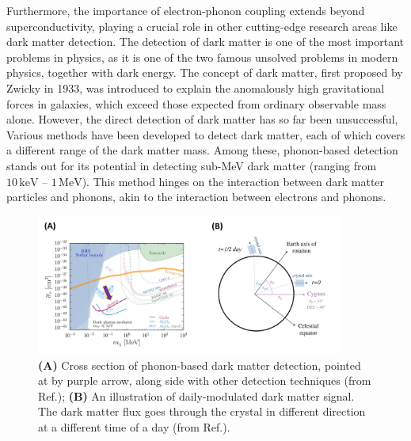 \documentclass[11pt]{article}
\begin{document}
Furthermore, the importance of electron-phonon coupling extends beyond superconductivity, playing a crucial role in other cutting-edge research areas like dark matter detection. The detection of dark matter is one of the most important problems in physics, as it is one of the two famous unsolved problems in modern physics, together with dark energy.
The concept of dark matter, first proposed by Zwicky in 1933\cite{andernach_english_2017}, was introduced to explain the anomalously high gravitational forces in galaxies, which exceed those expected from ordinary observable mass alone. However, the direct detection of dark matter has so far been unsuccessful,
Various methods have been developed to detect dark matter\cite{bergstrom_non-baryonic_2000}, each of which covers a different range of the dark matter mass\cite{vogel_dark_2014,essig_first_2012,davidson_updated_2000}. Among these, phonon-based detection stands out for its potential in detecting sub-MeV dark matter (ranging from $ 10\,\mathrm{keV}$ -- $1\,\mathrm{MeV}$). This method hinges on the interaction between dark matter particles and phonons, akin to the interaction between electrons and phonons\cite{griffin_directional_2018}. 

\begin{figure}
    \centering
    \includegraphics[width=0.9\textwidth]{figures/third_figure.jpg}
    \caption{\textbf{(A)} Cross section of phonon-based dark matter detection, pointed at by purple arrow, along side with other detection techniques (from Ref.\cite{griffin_directional_2018}); \textbf{(B)} An illustration of daily-modulated dark matter signal. The dark matter flux goes through the crystal in different direction at a different time of a day (from Ref.\cite{griffin_directional_2018}).}
    \label{third_figure}
\end{figure}
\end{document}
